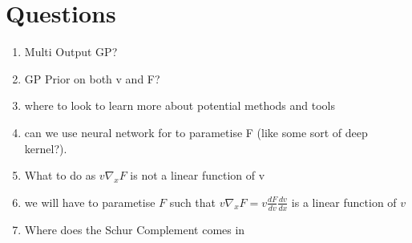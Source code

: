 \documentclass{article}
\begin{document}
\section*{Questions}
\begin{enumerate}
  \item Multi Output GP?
  \item GP Prior on both v and F?
  \item where to look to learn more about potential methods and tools
  \item can we use neural network for to parametise F (like some sort of deep kernel?).
  \item What to do as $v\nabla_xF$ is not a linear function of v
  \item we will have to parametise $F$ such that $v\nabla_xF=v\frac{dF}{dv}\frac{dv}{dx}$ is a linear function of $v$
  \item Where does the Schur Complement comes in 
\end{enumerate}
\end{document}
